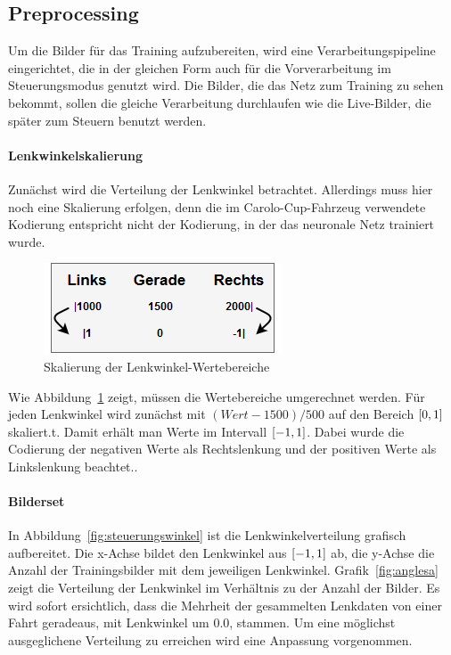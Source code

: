 \subsection{Preprocessing}

Um die Bilder für das Training aufzubereiten, wird eine Verarbeitungspipeline eingerichtet, die in der gleichen Form auch für die Vorverarbeitung im Steuerungsmodus genutzt wird. Die Bilder, die das Netz zum Training zu \glqq sehen \grqq{} bekommt, sollen die gleiche Verarbeitung durchlaufen wie die Live-Bilder, die später zum Steuern benutzt werden.

\paragraph{Lenkwinkelskalierung}
Zunächst wird die Verteilung der Lenkwinkel betrachtet. Allerdings muss hier noch eine Skalierung erfolgen, denn die im Carolo-Cup-Fahrzeug verwendete Kodierung entspricht nicht der Kodierung, in der das neuronale Netz trainiert wurde. 

\begin{figure}[h]
	\centering
	\includegraphics[scale=0.6]{figures/Lenkwinkelskalierung.png}
	\caption{Skalierung der Lenkwinkel-Wertebereiche}
	\label{img:skalierunglenkwinkel}
\end{figure}

Wie Abbildung~\ref{img:skalierunglenkwinkel} zeigt, müssen die Wertebereiche umgerechnet werden. Für jeden Lenkwinkel wird zunächst mit $(Wert-1500)/500$ auf den Bereich $\interval{0}{1}$ skaliert.t. Damit erhält man Werte im Intervall $\interval{-1}{1}$. Dabei wurde die Codierung der negativen Werte als Rechtslenkung und der positiven Werte als Linkslenkung beachtet..

\paragraph{Bilderset}
In Abbildung~\ref{fig:steuerungswinkel} ist die Lenkwinkelverteilung grafisch aufbereitet. Die x-Achse bildet den Lenkwinkel aus $\interval{-1}{1}$ ab, die y-Achse die Anzahl der Trainingsbilder mit dem jeweiligen Lenkwinkel. Grafik~\ref{fig:anglesa} zeigt die Verteilung der Lenkwinkel im Verhältnis zu der Anzahl der Bilder. Es wird sofort ersichtlich, dass die Mehrheit der gesammelten Lenkdaten von einer Fahrt geradeaus, mit Lenkwinkel um 0.0, stammen. Um eine möglichst ausgeglichene Verteilung zu erreichen wird eine Anpassung vorgenommen.

